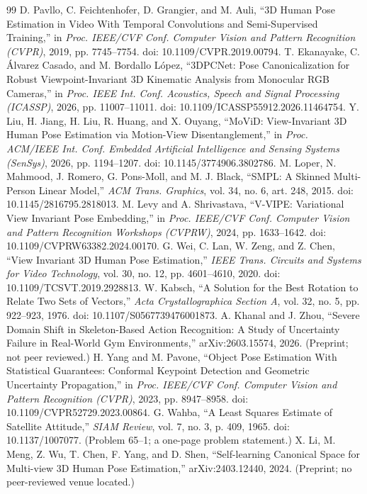 \documentclass[12pt,a4paper]{report}
\begin{document}
\begin{thebibliography}{99}
 D. Pavllo, C. Feichtenhofer, D. Grangier, and M. Auli, ``3D Human Pose Estimation in Video With Temporal Convolutions and Semi-Supervised Training,'' in \emph{Proc. IEEE/CVF Conf. Computer Vision and Pattern Recognition (CVPR)}, 2019, pp. 7745--7754. doi: 10.1109/CVPR.2019.00794.
 T. Ekanayake, C. \'{A}lvarez Casado, and M. Bordallo L\'{o}pez, ``3DPCNet: Pose Canonicalization for Robust Viewpoint-Invariant 3D Kinematic Analysis from Monocular RGB Cameras,'' in \emph{Proc. IEEE Int. Conf. Acoustics, Speech and Signal Processing (ICASSP)}, 2026, pp. 11007--11011. doi: 10.1109/ICASSP55912.2026.11464754.
 Y. Liu, H. Jiang, H. Liu, R. Huang, and X. Ouyang, ``MoViD: View-Invariant 3D Human Pose Estimation via Motion-View Disentanglement,'' in \emph{Proc. ACM/IEEE Int. Conf. Embedded Artificial Intelligence and Sensing Systems (SenSys)}, 2026, pp. 1194--1207. doi: 10.1145/3774906.3802786.
 M. Loper, N. Mahmood, J. Romero, G. Pons-Moll, and M. J. Black, ``SMPL: A Skinned Multi-Person Linear Model,'' \emph{ACM Trans. Graphics}, vol. 34, no. 6, art. 248, 2015. doi: 10.1145/2816795.2818013.
 M. Levy and A. Shrivastava, ``V-VIPE: Variational View Invariant Pose Embedding,'' in \emph{Proc. IEEE/CVF Conf. Computer Vision and Pattern Recognition Workshops (CVPRW)}, 2024, pp. 1633--1642. doi: 10.1109/CVPRW63382.2024.00170.
 G. Wei, C. Lan, W. Zeng, and Z. Chen, ``View Invariant 3D Human Pose Estimation,'' \emph{IEEE Trans. Circuits and Systems for Video Technology}, vol. 30, no. 12, pp. 4601--4610, 2020. doi: 10.1109/TCSVT.2019.2928813.
 W. Kabsch, ``A Solution for the Best Rotation to Relate Two Sets of Vectors,'' \emph{Acta Crystallographica Section A}, vol. 32, no. 5, pp. 922--923, 1976. doi: 10.1107/S0567739476001873.
 A. Khanal and J. Zhou, ``Severe Domain Shift in Skeleton-Based Action Recognition: A Study of Uncertainty Failure in Real-World Gym Environments,'' arXiv:2603.15574, 2026. (Preprint; not peer reviewed.)
 H. Yang and M. Pavone, ``Object Pose Estimation With Statistical Guarantees: Conformal Keypoint Detection and Geometric Uncertainty Propagation,'' in \emph{Proc. IEEE/CVF Conf. Computer Vision and Pattern Recognition (CVPR)}, 2023, pp. 8947--8958. doi: 10.1109/CVPR52729.2023.00864.
 G. Wahba, ``A Least Squares Estimate of Satellite Attitude,'' \emph{SIAM Review}, vol. 7, no. 3, p. 409, 1965. doi: 10.1137/1007077. (Problem 65--1; a one-page problem statement.)
 X. Li, M. Meng, Z. Wu, T. Chen, F. Yang, and D. Shen, ``Self-learning Canonical Space for Multi-view 3D Human Pose Estimation,'' arXiv:2403.12440, 2024. (Preprint; no peer-reviewed venue located.)

\end{thebibliography}
\end{document}
